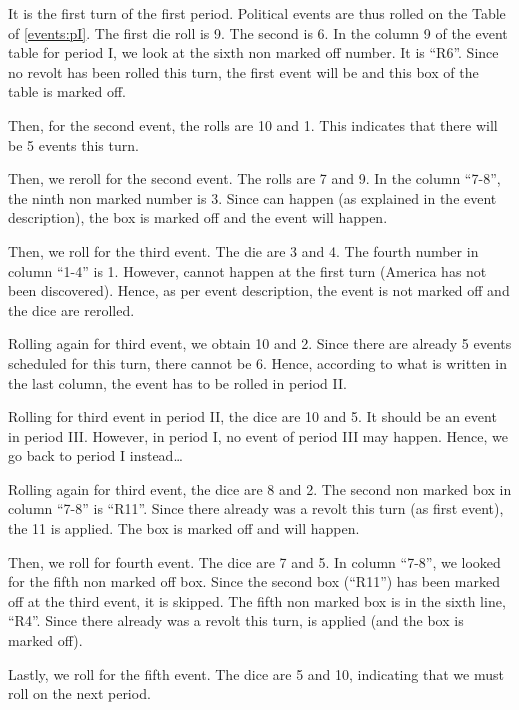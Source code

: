 \begin{exemple}
  It is the first turn of the first period. Political events are thus
  rolled on the Table of \ref{events:pI}. The first die roll is 9. The
  second is 6. In the column 9 of the event table for period I, we
  look at the sixth non marked off number. It is ``R6''. Since no
  revolt has been rolled this turn, the first event will be \RD and
  this box of the table is marked off.

  Then, for the second event, the rolls are 10 and 1. This indicates
  that there will be 5 events this turn.

  Then, we reroll for the second event. The rolls are 7 and 9. In the
  column ``7-8'', the ninth non marked number is 3. Since  can happen (as explained in the event description),
  the box is marked off and the event will happen.

  Then, we roll for the third event. The die are 3 and 4. The fourth
  number in column ``1-4'' is 1. However,  cannot
  happen at the first turn (America has not been discovered). Hence, as
  per event description, the event is not marked off and the dice are
  rerolled.

  Rolling again for third event, we obtain 10 and 2. Since there are
  already 5 events scheduled for this turn, there cannot be 6. Hence,
  according to what is written in the last column, the event has to be
  rolled in period II.

  Rolling for third event in period II, the dice are 10 and 5. It should
  be an event in period III. However, in period I, no event of period
  III may happen. Hence, we go back to period I instead\ldots

  Rolling again for third event, the dice are 8 and 2. The second non
  marked box in column ``7-8'' is ``R11''. Since there already was a
  revolt this turn (as first event), the 11 is applied. The box is
  marked off and  will happen.

  Then, we roll for fourth event. The dice are 7 and 5. In column
  ``7-8'', we looked for the fifth non marked off box. Since the second
  box (``R11'') has been marked off at the third event, it is
  skipped. The fifth non marked box is in the sixth line, ``R4''. Since
  there already was a revolt this turn,  is
  applied (and the box is marked off).

  Lastly, we roll for the fifth event. The dice are 5 and 10, indicating
  that we must roll on the next period.


\end{exemple}
